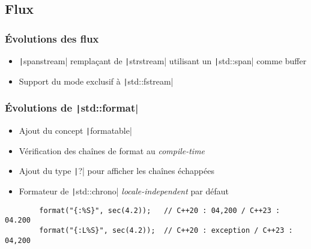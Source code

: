 \documentclass[C++.tex]{subfiles}
\begin{document}
\subsection*{Flux}
\begin{frame}[fragile]
	\frametitle{Évolutions des flux}
	\begin{itemize}
		\item \texttt|spanstream| remplaçant de \texttt|strstream| utilisant un \texttt|std::span| comme buffer


		\item Support du mode exclusif à \texttt|std::fstream|
	\end{itemize}
\end{frame}

\begin{frame}[fragile]
	\frametitle{Évolutions de \texttt|std::format|}
	\begin{itemize}
		\item Ajout du concept \texttt|formatable|
		\item Vérification des chaînes de format au \textit{compile-time}
		\item Ajout du type \texttt|?| pour afficher les chaînes échappées
		\item Formateur de \texttt|std::chrono| \textit{locale-independent} par défaut

	\end{itemize}

	\begin{verbatim}
		format("{:%S}", sec(4.2));   // C++20 : 04,200 / C++23 : 04.200
		format("{:L%S}", sec(4.2));  // C++20 : exception / C++23 : 04,200
	\end{verbatim}
\end{frame}
\end{document}
